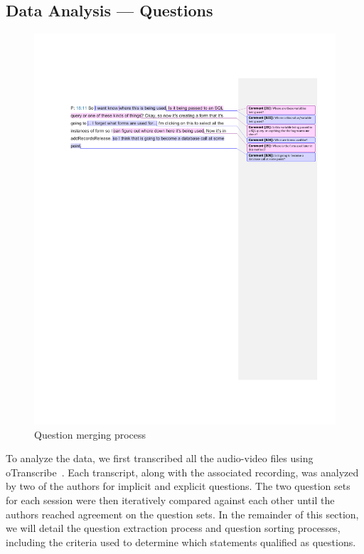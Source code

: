 \documentclass[10pt,journal,compsoc]{IEEEtran}
\begin{document}
\subsection{Data Analysis --- Questions}
\begin{figure}
	\centering
	\includegraphics[trim={0 0 0 3mm},clip, width=\textwidth]{Images/QuestionMerging}
	\caption{Question merging process}
	\label{fig:merging} 
\end{figure}

\label{sec:questionAnalysis}
To analyze the data, we first transcribed all the audio-video files using oTranscribe~\cite{OTranscribe}.
Each transcript, along with the associated recording, was analyzed by two of the authors for implicit and explicit questions. 
The two question sets for each session were then iteratively compared against each other until the authors reached agreement on the question sets. 
In the remainder of this section, we will detail the question extraction process and question sorting processes, including the criteria used to determine which statements qualified as questions.
\end{document}
